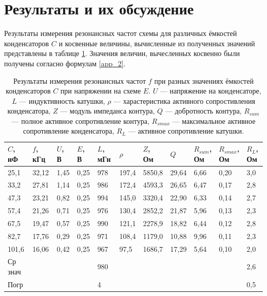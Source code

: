 \documentclass[12pt]{article}
\begin{document}
\section{Результаты и их обсуждение}
Результаты измерения резонансных частот схемы для различных ёмкостей конденсаторов $C$ и косвенные величины, вычисленные
из полученных значений представлены в таблице \ref{tab:1}. Значения величин, вычесленных косвенно были получены согласно формулам \ref{app_2}.
\begin{table}[H]
    \centering
    \begin{tabular}{|l|l|l|l|l|l|l|l|l|l|l|}
        \hline
        $C$, нФ & $f$, кГц & $U$, В & $E$, В & $L$, мГн & $\rho$ & $Z$, Ом & $Q$   & $R_{sum}$, Ом & $R_{smax}$, Ом & $R_L$, Ом \\ \hline
        25,1    & 32,12    & 1,45   & 0,25   & 978      & 197,4  & 5850,8  & 29,64 & 6,66          & 0,20           & 3,0       \\ \hline
        33,2    & 27,81    & 1,14   & 0,25   & 986      & 172,4  & 4593,3  & 26,65 & 6,47          & 0,17           & 2,8       \\ \hline
        47,3    & 23,21    & 0,82   & 0,25   & 994      & 145,0  & 3320,4  & 22,90 & 6,33          & 0,14           & 2,7       \\ \hline
        57,4    & 21,26    & 0,71   & 0,25   & 976      & 130,4  & 2852,2  & 21,87 & 5,96          & 0,13           & 2,3       \\ \hline
        67,5    & 19,47    & 0,57   & 0,25   & 990      & 121,1  & 2278,9  & 18,82 & 6,44          & 0,12           & 2,8       \\ \hline
        82,7    & 17,76    & 0,29   & 0,25   & 971      & 108,4  & 1179,0  & 10,88 & 9,96          & 0,11           & 2,3       \\ \hline
        101,6   & 16,06    & 0,42   & 0,25   & 967      & 97,5   & 1686,7  & 17,29 & 5,64          & 0,10           & 2,0       \\ \hline
        Ср знач & ~        & ~      & ~      & 980      & ~      & ~       & ~     & ~             & ~              & 2,6       \\ \hline
        Погр    & ~        & ~      & ~      & 4        & ~      & ~       & ~     & ~             & ~              & 0,5       \\ \hline
    \end{tabular}
    \caption{Результаты измерения резонансных частот $f$ при разных значениях ёмкостей конденсаторов $C$ при
        напряжении на схеме $E$. $U$ --- напряжение на конденсаторе, $L$ --- индуктивность катушки, $\rho$ --- харастеристика
        активного сопростивления конденсатора, $Z$ --- модуль импеданса контура, $Q$ --- добротность контура,
        $R_{sum}$ --- полное активное сопротивление контура, $R_{smax}$ --- максимальное активное сопротивление конденсатора,
        $R_L$ --- активное сопротивление катушки.
    }
    \label{tab:1}
\end{table}
\end{document}
